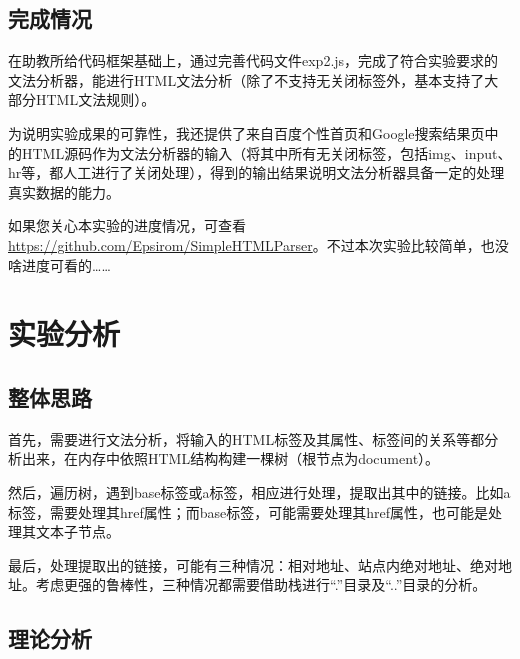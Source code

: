 \documentclass[a4paper]{article}
\begin{document}
\begin{CJK*}{UTF8}{gbsn}
    \subsection{完成情况}
    \label{sec:comp}
    在助教所给代码框架基础上，通过完善代码文件exp2.js，完成了符合实验要求的文法分析器，能进行HTML文法分析（除了不支持无关闭标签外，基本支持了大部分HTML文法规则）。
    \par 为说明实验成果的可靠性，我还提供了来自百度个性首页和Google搜索结果页中的HTML源码作为文法分析器的输入（将其中所有无关闭标签，包括img、input、hr等，都人工进行了关闭处理），得到的输出结果说明文法分析器具备一定的处理真实数据的能力。
    \par 如果您关心本实验的进度情况，可查看\href{https://github.com/Epsirom/SimpleHTMLParser}{https://github.com/Epsirom/SimpleHTMLParser}。不过本次实验比较简单，也没啥进度可看的……

    \section{实验分析}
    \subsection{整体思路}
    首先，需要进行文法分析，将输入的HTML标签及其属性、标签间的关系等都分析出来，在内存中依照HTML结构构建一棵树（根节点为document）。
    \par 然后，遍历树，遇到base标签或a标签，相应进行处理，提取出其中的链接。比如a标签，需要处理其href属性；而base标签，可能需要处理其href属性，也可能是处理其文本子节点。
    \par 最后，处理提取出的链接，可能有三种情况：相对地址、站点内绝对地址、绝对地址。考虑更强的鲁棒性，三种情况都需要借助栈进行“.”目录及“..”目录的分析。

    \subsection{理论分析}

\end{CJK*}
\end{document}
